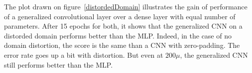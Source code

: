  The plot drawn on figure~\ref{distordedDomain} illustrates the gain of performance of a generalized convolutional layer over a dense layer with equal number of parameters. After 15 epochs for both, it shows that the generalized CNN on a distorded domain performs better than the MLP. Indeed, in the case of no domain distortion, the score is the same than a CNN with zero-padding. The error rate goes up a bit with distortion. But even at $200\mu$, the generalized CNN still performs better than the MLP.